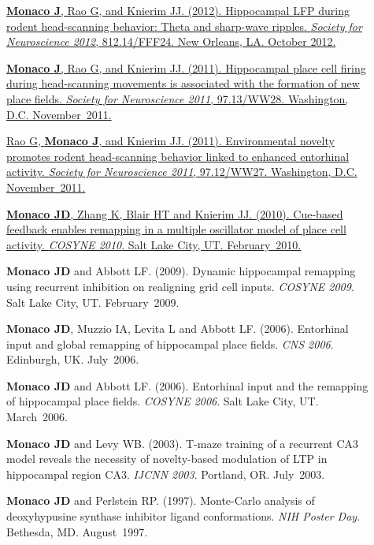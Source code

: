 \documentclass[10pt]{article}
\begin{document}
\begin{description}
\item[\quad] \href{http://www.abstractsonline.com/Plan/ViewAbstract.aspx?sKey=f5b9fa94-7d15-48c7-9d67-b89cd2883025&cKey=a53349ca-41b1-4664-b022-85d0d1fe59b8&mKey=\%7b70007181-01C9-4DE9-A0A2-EEBFA14CD9F1\%7d}{\textbf{Monaco J}, Rao G, and Knierim JJ. (2012). Hippocampal LFP during rodent head-scanning behavior: Theta and sharp-wave ripples. \emph{Society for Neuroscience 2012}, 812.14/FFF24. New Orleans, LA. October 2012.}
\item[\quad] \href{http://www.abstractsonline.com/Plan/ViewAbstract.aspx?sKey=c48e9f5f-1274-4486-85bf-38ee591629e1&cKey=190bd951-c183-428d-a4c5-01eb61556d79&mKey=\%7b8334BE29-8911-4991-8C31-32B32DD5E6C8\%7d}{\textbf{Monaco J}, Rao G, and Knierim JJ. (2011). Hippocampal place cell firing during head-scanning movements is associated with the formation of new place fields. \emph{Society for Neuroscience 2011}, 97.13/WW28. Washington, D.C. November~2011.}
\item[\quad] \href{http://www.abstractsonline.com/Plan/ViewAbstract.aspx?sKey=c48e9f5f-1274-4486-85bf-38ee591629e1&cKey=3ec26e6f-8c59-4be2-bad3-e1572d75e07e&mKey=\%7b8334BE29-8911-4991-8C31-32B32DD5E6C8\%7d}{Rao G, \textbf{Monaco J}, and Knierim JJ. (2011). Environmental novelty promotes rodent head-scanning behavior linked to enhanced entorhinal activity. \emph{Society for Neuroscience 2011}, 97.12/WW27. Washington, D.C. November~2011.}
\item[\quad] \href{http://www.frontiersin.org/10.3389/conf.fnins.2010.03.00192/event_abstract}{\textbf{Monaco JD}, Zhang K, Blair HT and Knierim JJ. (2010). Cue-based feedback enables remapping in a multiple oscillator model of place cell activity. \emph{COSYNE 2010}. Salt Lake City, UT. February~2010.}
\item[\quad] \textbf{Monaco JD} and Abbott LF. (2009). Dynamic hippocampal remapping using recurrent inhibition on realigning grid cell inputs. \emph{COSYNE 2009}. Salt Lake City, UT. February~2009.
\item[\quad] \textbf{Monaco JD}, Muzzio IA, Levita L and Abbott LF. (2006). Entorhinal input and global remapping of hippocampal place fields. \emph{CNS 2006}. Edinburgh, UK. July~2006.
\item[\quad] \textbf{Monaco JD} and Abbott LF. (2006). Entorhinal input and the remapping of hippocampal place fields. \emph{COSYNE 2006}. Salt Lake City, UT. March~2006.
\item[\quad] \textbf{Monaco JD} and Levy WB. (2003). T-maze training of a recurrent CA3 model reveals the necessity of novelty-based modulation of LTP in hippocampal region CA3. \emph{IJCNN 2003}. Portland, OR. July~2003.
\item[\quad] \textbf{Monaco JD} and Perlstein RP. (1997). Monte-Carlo analysis of deoxyhypusine synthase inhibitor ligand conformations. \emph{NIH Poster Day}. Bethesda, MD. August~1997.
\end{description}
\end{document}
